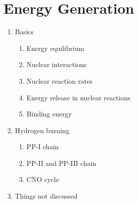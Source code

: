 \documentclass{article}
\begin{document}
\section{Energy Generation}
\begin{enumerate}
    \item Basics
        \begin{enumerate}
            \item Energy equilibrium
            \item Nuclear interactions
            \item Nuclear reaction rates
            \item Energy release in nuclear reactions
            \item Binding energy
        \end{enumerate}
    \item Hydrogen burning
        \begin{enumerate}
            \item PP-I chain
            \item PP-II and PP-III chain
            \item CNO cycle
        \end{enumerate}
    \item Things not discussed
\end{enumerate}

\newpage
\end{document}
